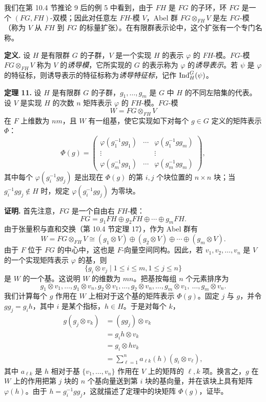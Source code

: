 我们在第 10.4 节推论 9 后的例 5 中看到，由于 $FH$ 是 $FG$ 的子环，环 $FG$ 是一个 $(FG,FH)$-双模；因此对任意左 $FH$-模 $V$，Abel 群 $FG\otimes_{FH}V$ 是左 $FG$-模（称为 $V$ 从 $FH$ 到 $FG$ 的标量扩张）。在有限群表示论中，这个扩张有一个专门名称。

\noindent\textbf{定义.} 设 $H$ 是有限群 $G$ 的子群，$V$ 是一个实现 $H$ 的表示 $\varphi$ 的 $FH$-模。$FG$-模 $FG\otimes_{FH}V$ 称为 $V$ 的\emph{诱导模}，它所实现的 $G$ 的表示称为 $\varphi$ 的\emph{诱导表示}。若 $\psi$ 是 $\varphi$ 的特征标，则诱导表示的特征标称为\emph{诱导特征标}，记作 $\operatorname{Ind}_H^G(\psi)$。

\noindent\textbf{定理 11.} 设 $H$ 是有限群 $G$ 的子群，$g_1,\ldots,g_m$ 是 $G$ 中 $H$ 的不同左陪集的代表。设 $V$ 是实现 $H$ 的次数 $n$ 矩阵表示 $\varphi$ 的 $FH$-模。$FG$-模
\[
  W=FG\otimes_{FH}V
\]
在 $F$ 上维数为 $nm$，且 $W$ 有一组基，使它实现如下对每个 $g\in G$ 定义的矩阵表示 $\Phi$：
\[
\Phi(g)=
\begin{pmatrix}
\varphi(g_1^{-1}gg_1)&\cdots&\varphi(g_1^{-1}gg_m)\\
\vdots&&\vdots\\
\varphi(g_m^{-1}gg_1)&\cdots&\varphi(g_m^{-1}gg_m)
\end{pmatrix},
\]
其中每个 $\varphi(g_i^{-1}gg_j)$ 是出现在 $\Phi(g)$ 的第 $i,j$ 个块位置的 $n\times n$ 块；当 $g_i^{-1}gg_j\notin H$ 时，规定 $\varphi(g_i^{-1}gg_j)$ 为零块。

\noindent\textbf{证明.} 首先注意，$FG$ 是一个自由右 $FH$-模：
\[
  FG=g_1FH\oplus g_2FH\oplus\cdots\oplus g_mFH.
\]
由于张量积与直和交换（第 10.4 节定理 17），作为 Abel 群有
\[
  W=FG\otimes_{FH}V\cong (g_1\otimes V)\oplus(g_2\otimes V)\oplus\cdots\oplus(g_m\otimes V).
\]
由于 $F$ 位于 $FG$ 的中心中，这也是 $F$-向量空间同构。因此，若 $v_1,v_2,\ldots,v_n$ 是 $V$ 的一个实现矩阵表示 $\varphi$ 的基，则
\[
  \{g_i\otimes v_j\mid 1\leq i\leq m,
  1\leq j\leq n\}
\]
是 $W$ 的一个基。这说明 $W$ 的维数为 $mn$。把基按每组 $n$ 个元素排序为
\[
  g_1\otimes v_1,\ldots,g_1\otimes v_n,
  g_2\otimes v_1,
  \ldots,g_2\otimes v_n,
  \ldots,
  g_m\otimes v_1,\
  \ldots,g_m\otimes v_n.
\]
我们计算每个 $g$ 作用在 $W$ 上相对于这个基的矩阵表示 $\Phi(g)$。固定 $j$ 与 $g$，并令 $gg_j=g_i h$，其中 $i$ 是某个指标，$h\in H$。于是对每个 $k$，
\[
\begin{aligned}
  g(g_j\otimes v_k)
  &=(gg_j)\otimes v_k\\
  &=g_i h\otimes v_k\\
  &=g_i\otimes hv_k\\
  &=\sum_{\ell=1}^n a_{\ell k}(h)(g_i\otimes v_\ell),
\end{aligned}
\]
其中 $a_{\ell k}$ 是 $h$ 相对于基 $\{v_1,\ldots,v_n\}$ 作用在 $V$ 上的矩阵的 $\ell,k$ 项。换言之，$g$ 在 $W$ 上的作用把第 $j$ 块的 $n$ 个基向量送到第 $i$ 块的基向量，并在该块上具有矩阵 $\varphi(h)$。由于 $h=g_i^{-1}gg_j$，这就描述了定理中的块矩阵 $\Phi(g)$，证毕。

